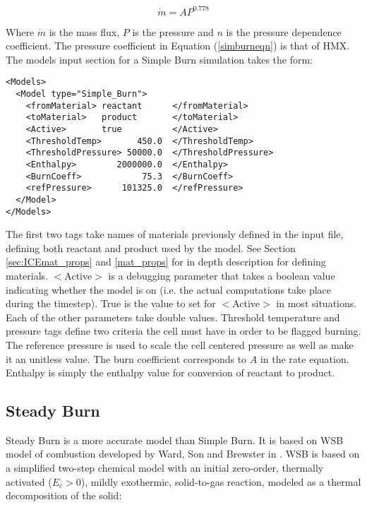 \begin{equation}
\dot{m}=A P^{0.778}
\label{simburneqn}
\end{equation}

Where $\dot{m}$ is the mass flux, $P$ is the pressure and $n$ is the pressure dependence coefficient.  The pressure coefficient in Equation (\ref{simburneqn}) is that of HMX.  The models input section for a Simple Burn simulation takes the form: 

\begin{verbatim}
<Models>
  <Model type="Simple_Burn">
    <fromMaterial> reactant      </fromMaterial>
    <toMaterial>   product       </toMaterial>
    <Active>       true          </Active>
    <ThresholdTemp>       450.0  </ThresholdTemp>
    <ThresholdPressure> 50000.0  </ThresholdPressure>
    <Enthalpy>        2000000.0  </Enthalpy>
    <BurnCoeff>            75.3  </BurnCoeff>
    <refPressure>      101325.0  </refPressure>
  </Model>
</Models>
\end{verbatim}

The first two tags take names of materials previously defined in the input file, defining both reactant and product used by the model.  See Section \ref{sec:ICEmat_props} and \ref{mat_props} for in depth description for defining materials.  $<$Active$>$ is a debugging parameter that takes a boolean value indicating whether the model is on (i.e. the actual computations take place during the timestep).  True is the value to set for $<$Active$>$ in most situations.  Each of the other parameters take double values.  Threshold temperature and pressure tags define two criteria the cell must have in order to be flagged burning.  The reference pressure is used to scale the cell centered pressure as well as make it an unitless value.  The burn coefficient corresponds to $A$ in the rate equation.  Enthalpy is simply the enthalpy value for conversion of reactant to product.
\newpage
\subsection{Steady Burn} \label{Sec:SteadyBurn}

Steady Burn is a more accurate model than Simple Burn.  It is based on WSB model of combustion developed by Ward, Son and Brewster in \cite{ref:wardsonbrewster}.  WSB is based on a simplified two-step chemical model with an initial zero-order, thermally activated ($E_c > 0$), mildly exothermic, solid-to-gas reaction, modeled as a thermal decomposition of the solid:

